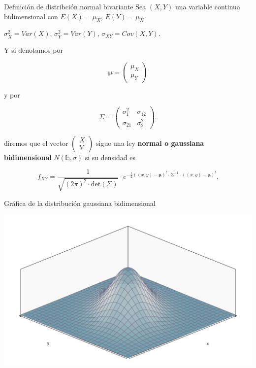 \documentclass[
  ignorenonframetext,
]{beamer}
\begin{document}
\begin{frame}{Definición de distribción normal bivariante}
\protect\hypertarget{definiciuxf3n-de-distribciuxf3n-normal-bivariante}{}
Sea \((X,Y)\) una variable continua bidimensional con \(E(X)=\mu_X\),
\(E(Y)=\mu_X\)

\(\sigma^2_X=Var(X)\), \(\sigma^2_Y=Var(Y)\), \(\sigma_{XY}=Cov(X,Y)\).

Y si denotamos por

\[
\mathbf{\mu}=\left(\begin{array}{c}\mu_X \\ \mu_Y\end{array}\right)
\]

y por

\[
 \Sigma=\left(\begin{matrix}
 \sigma_{1}^2 & \sigma_{12}\\
 \sigma_{21} &  \sigma_{2}^2
 \end{matrix}\right).
\]

diremos que el vector
\(\left(\begin{array}{c} X \\ Y\end{array}\right)\) sigue una ley
\textbf{normal o gaussiana bidimensional} \(N(\mathbb{b},\sigma)\) si su
densidad es

\[
f_{XY}=\frac{1}{\sqrt{(2\pi)^2\cdot \mathrm{det}(\Sigma)}} \cdot e^{-\frac{1}{2} ((x,y)-\mathbf{\mu})^t\cdot \Sigma^{-1}\cdot  ((x,y)-\mathbf{\mu})^t}.
\]
\end{frame}

\begin{frame}{Gráfica de la distribución gaussiana bidimensional}
\protect\hypertarget{gruxe1fica-de-la-distribuciuxf3n-gaussiana-bidimensional}{}
\begin{center}\includegraphics{Tema_4_VA_Continuas_multidimensionales_files/figure-beamer/unnamed-chunk-1-1} \end{center}
\end{frame}
\end{document}

